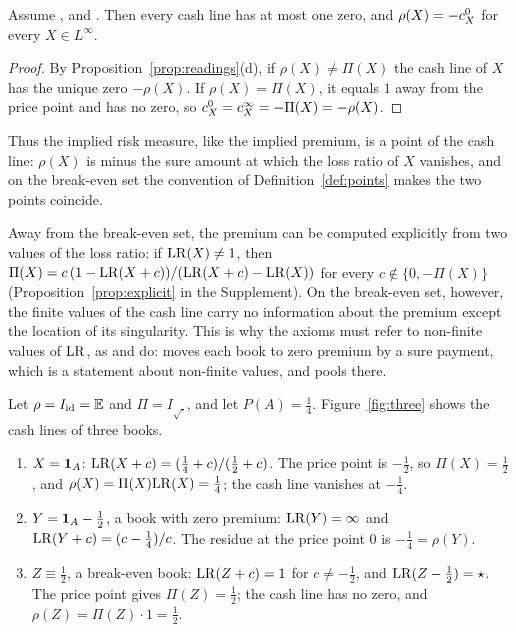 \begin{corollary}\label{cor:zero}
Assume \axP, \axN{} and \axCM. Then every cash line has at most one zero, and $\rho(X)=-c^{0}_{X}$ for every
$X\in L^\infty$.
\end{corollary}

\begin{proof}
By Proposition~\ref{prop:readings}(d), if $\rho(X)\ne\Pi(X)$ the cash line of $X$ has the unique zero $-\rho(X)$. If
$\rho(X)=\Pi(X)$, it equals $1$ away from the price point and has no zero, so $c^{0}_{X}=c^{\infty}_{X}=-\Pi(X)=-\rho(X)$.
\qedhere
\end{proof}

Thus the implied risk measure, like the implied premium, is a point of the cash line: $\rho(X)$ is minus the sure
amount at which the loss ratio of $X$ vanishes, and on the break-even set the convention of
Definition~\ref{def:points} makes the two points coincide.

Away from the break-even set, the premium can be computed explicitly from two values of the loss ratio: if
$\mathrm{LR}(X)\ne1$, then $\Pi(X)=c\,(1-\mathrm{LR}(X+c))/(\mathrm{LR}(X+c)-\mathrm{LR}(X))$ for every $c\notin\{0,-\Pi(X)\}$
(Proposition~\ref{prop:explicit} in the Supplement). On the break-even set, however, the finite values of the cash
line carry no information about the premium except the location of its singularity. This is why the axioms must
refer to non-finite values of $\mathrm{LR}$, as \axPe{} and \axR{} do: \axR{} moves each book to zero premium by a sure
payment, which is a statement about non-finite values, and pools there.



\begin{example}\label{ex:three}
Let $\rho=I_{\mathrm{id}}=\mathbb E$ and $\Pi=I_{\sqrt{\cdot}}$, and let $P(A)=\tfrac14$. Figure~\ref{fig:three} shows
the cash lines of three books.
\begin{enumerate}[label=(\roman*),nosep]
\item $X=\mathbf 1_A$: $\mathrm{LR}(X+c)=(\tfrac14+c)/(\tfrac12+c)$. The price point is $-\tfrac12$, so $\Pi(X)=\tfrac12$, and
  $\rho(X)=\Pi(X)\mathrm{LR}(X)=\tfrac14$; the cash line vanishes at $-\tfrac14$.
\item $Y=\mathbf 1_A-\tfrac12$, a book with zero premium: $\mathrm{LR}(Y)=\infty$ and $\mathrm{LR}(Y+c)=(c-\tfrac14)/c$. The residue at
  the price point $0$ is $-\tfrac14=\rho(Y)$.
\item $Z\equiv\tfrac12$, a break-even book: $\mathrm{LR}(Z+c)=1$ for $c\ne-\tfrac12$, and $\mathrm{LR}(Z-\tfrac12)=\star$. The
  price point gives $\Pi(Z)=\tfrac12$; the cash line has no zero, and $\rho(Z)=\Pi(Z)\cdot1=\tfrac12$.
\end{enumerate}
\end{example}

